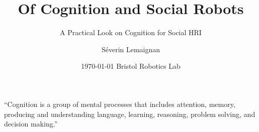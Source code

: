 \documentclass[compress]{beamer}
\title{Of Cognition and Social Robots}
\subtitle{A Practical Look on Cognition for Social HRI}
\date{{\Medium \today} Bristol Robotics Lab}
\author{Séverin Lemaignan}
\institute{Centre for Robotics and Neural Systems\\{\Medium
Plymouth University}}
\begin{document}
\maketitle



\begin{frame}[plain]{}

        \LARGE

        ``Cognition is a group of mental processes that includes {\Medium
        attention}, {\Medium memory}, producing and understanding {\Medium
        language}, {\Medium learning}, {\Medium reasoning}, {\Medium problem
        solving}, and {\Medium decision making}.''

\end{frame}
\end{document}
